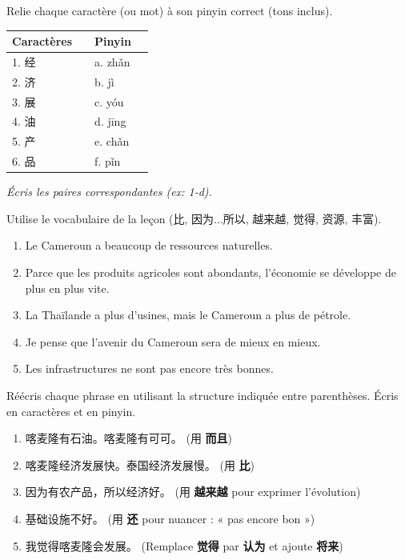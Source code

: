 \documentclass[11pt]{article}
\newcounter{popsec}
\newcounter{popsub}
\newcommand{\courssub}[1]{%
  \stepcounter{popsub}%
  \par\vspace{9pt}\noindent{\popxbold\fontsize{11.5}{13}\selectfont\color{popink}{\color{poporange}\thepopsec.\thepopsub}\hspace{6pt}#1}\par\nopagebreak\vspace{4pt}
}
\begin{document}
\begin{exercice}
Relie chaque caractère (ou mot) à son pinyin correct (tons inclus).
\begin{center}
\begin{tabular}{llll}
\textbf{Caractères} & & \textbf{Pinyin} & \\
\hline
1. 经 & \hspace{3cm} & a. zhǎn \\
2. 济 & & b. jì \\
3. 展 & & c. yóu \\
4. 油 & & d. jīng \\
5. 产 & & e. chǎn \\
6. 品 & & f. pǐn \\
\hline
\end{tabular}
\end{center}
\emph{Écris les paires correspondantes (ex: 1-d).}
\end{exercice}

\courssub{Je m'entraîne}

\begin{exercice}
Utilise le vocabulaire de la leçon (比, 因为...所以, 越来越, 觉得, 资源, 丰富).
\begin{enumerate}
    \item Le Cameroun a beaucoup de ressources naturelles.
    \item Parce que les produits agricoles sont abondants, l'économie se développe de plus en plus vite.
    \item La Thaïlande a plus d'usines, mais le Cameroun a plus de pétrole.
    \item Je pense que l'avenir du Cameroun sera de mieux en mieux.
    \item Les infrastructures ne sont pas encore très bonnes.
\end{enumerate}
\end{exercice}

\begin{exercice}
Réécris chaque phrase en utilisant la structure indiquée entre parenthèses. Écris en caractères et en pinyin.
\begin{enumerate}
    \item 喀麦隆有石油。喀麦隆有可可。 (用 \textbf{而且})
    \item 喀麦隆经济发展快。泰国经济发展慢。 (用 \textbf{比})
    \item 因为有农产品，所以经济好。 (用 \textbf{越来越} pour exprimer l'évolution)
    \item 基础设施不好。 (用 \textbf{还} pour nuancer : « pas encore bon »)
    \item 我觉得喀麦隆会发展。 (Remplace \textbf{觉得} par \textbf{认为}  et ajoute \textbf{将来})
\end{enumerate}
\end{exercice}
\end{document}
